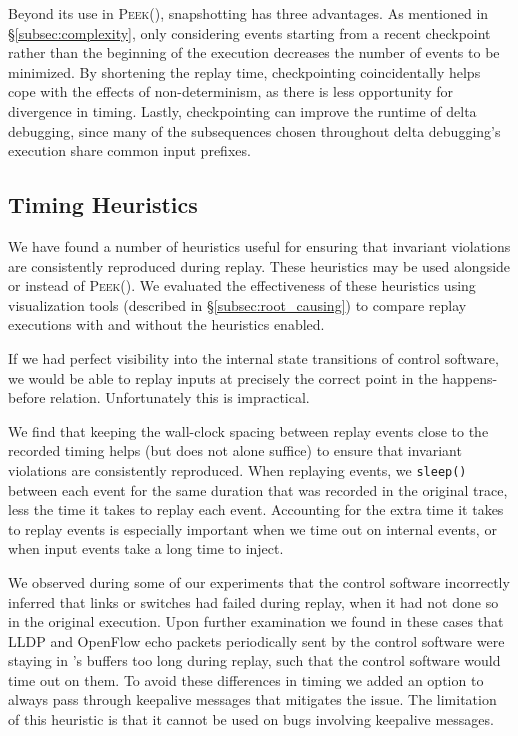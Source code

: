 Beyond its use in {\textsc{Peek()}}, snapshotting has three advantages.
As mentioned in \S\ref{subsec:complexity}, only considering events starting
from a recent checkpoint rather than the beginning of the execution decreases the number of events to
be minimized. By shortening the replay time, checkpointing coincidentally helps cope
with the effects of non-determinism, as there is less opportunity for
divergence in timing. Lastly, checkpointing can improve the runtime of delta
debugging, since many of the subsequences chosen throughout delta debugging's
execution share common input prefixes.

\subsection{Timing Heuristics}
\label{subsec:timing_heuristics}

We have found a number of
heuristics useful for ensuring that invariant violations are consistently reproduced during replay.
These heuristics may be used alongside or instead of {\textsc{Peek()}}. We evaluated the effectiveness
of these heuristics using visualization tools
(described in \S\ref{subsec:root_causing}) to compare replay executions with and
without the heuristics enabled.

 If we had perfect visibility into
the internal state transitions of control software, we would be able to replay inputs at precisely the correct point in
the happens-before relation. Unfortunately this is impractical.

We find that keeping the wall-clock spacing between replay events
close to the recorded timing helps (but does not alone suffice) to
ensure that invariant violations are consistently
reproduced. When replaying events, we \verb=sleep()= between each
event for the same duration that was recorded in the original trace,
less the time it takes to replay each event. Accounting for the
extra time it takes to replay events is especially important when we
time out on internal events, or when input events take a long time to inject.

 We observed during some
of our experiments that the control software incorrectly inferred that links or switches had
failed during replay, when it had not done so in the original execution.
Upon further examination we found in these cases that LLDP and OpenFlow echo
packets periodically sent by the control software were
staying in \projectname's buffers too long during replay, such that the
control software would time out on them. To avoid these differences in timing
we added an option to always pass through
keepalive messages that mitigates the issue. The limitation of this
heuristic is that it cannot be used on bugs involving keepalive messages.

